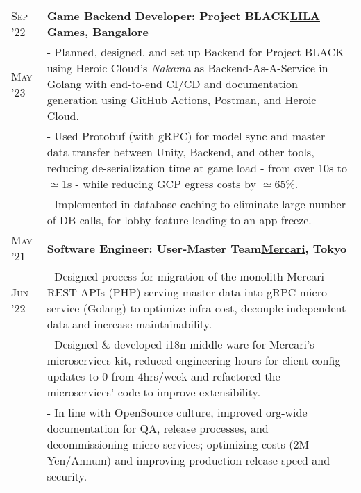 \documentclass[a4paper,10pt]{extarticle} %
\begin{document}
\begin{tabularx}{\linewidth}{ l | X }
  \textsc{Sep '22} & \textbf{Game Backend Developer: Project BLACK}\hfill\textbf{\href{https://www.lilagames.com/}{LILA Games}, Bangalore}                                                                                                                                                                                                                        \\
  \textsc{May '23} & {- Planned, designed, and set up Backend for Project BLACK using Heroic Cloud's \textit{Nakama} as Backend-As-A-Service in Golang with end-to-end CI/CD and documentation generation using GitHub Actions, Postman, and Heroic Cloud.}                                                                                                       \\
                   & {- Used Protobuf (with gRPC) for model sync and master data transfer between Unity, Backend, and other tools, reducing de-serialization time at game load - from over 10s to $\simeq$1s - while reducing GCP egress costs by $\simeq$65\%. }                                                                                                 \\
                   & {- Implemented in-database caching to eliminate large number of DB calls, for lobby feature leading to an app freeze.}                                                                                                                                                                                                                       \\[2mm]

  \textsc{May '21} & \textbf{Software Engineer: User-Master Team}\hfill\textbf{\href{https://mercari.com/}{Mercari}, Tokyo}                                                                                                                                                                                                                                       \\
  \textsc{Jun '22} & {- Designed process for migration of the monolith Mercari REST APIs (PHP) serving master data into gRPC micro-service (Golang) to optimize infra-cost, decouple independent data and increase maintainability.}                                                                                                                              \\
                   & {- Designed \& developed i18n middle-ware for Mercari's microservices-kit, reduced engineering hours for client-config updates to 0 from 4hrs/week and refactored the microservices' code to improve extensibility.}                                                                                                                         \\
                   & {- In line with OpenSource culture, improved org-wide documentation for QA, release processes, and decommissioning micro-services; optimizing costs (2M Yen/Annum) and improving production-release speed and security. }                                                                                                                    \\[2mm]


\end{tabularx}
\end{document}
